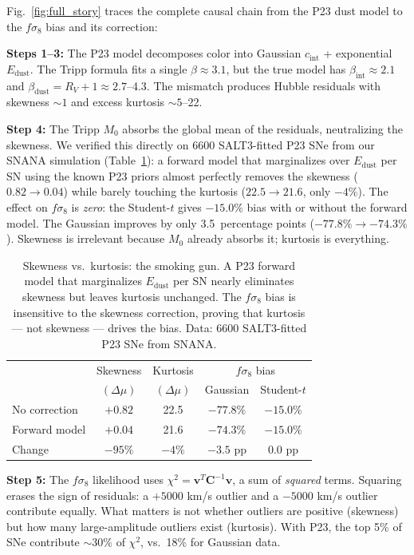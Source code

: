 \documentclass[fleqn,usenatbib]{mnras}
\begin{document}
Fig.~\ref{fig:full_story} traces the complete causal chain from
the P23 dust model to the $f\sigma_8$ bias and its correction:

\textbf{Steps 1--3:} The P23 model decomposes color into Gaussian
$c_\mathrm{int}$ + exponential $E_\mathrm{dust}$. The Tripp
formula fits a single $\beta \approx 3.1$, but the true model
has $\beta_\mathrm{int} \approx 2.1$ and
$\beta_\mathrm{dust} = R_V{+}1 \approx 2.7$--4.3. The mismatch
produces Hubble residuals with skewness $\sim 1$ and excess
kurtosis $\sim 5$--22.

\textbf{Step 4:} The Tripp $M_0$ absorbs the global mean of the
residuals, neutralizing the skewness. We verified this directly
on 6600 SALT3-fitted P23 SNe from our SNANA simulation
(Table~\ref{tab:skew_vs_kurt}): a forward model that
marginalizes over $E_\mathrm{dust}$ per SN using the known P23
priors almost perfectly removes the skewness ($0.82 \to 0.04$)
while barely touching the kurtosis ($22.5 \to 21.6$, only
$-4\%$). The effect on $f\sigma_8$ is \emph{zero}: the
Student-$t$ gives $-15.0\%$ bias with or without the forward
model. The Gaussian improves by only 3.5~percentage points
($-77.8\% \to -74.3\%$). Skewness is irrelevant because $M_0$
already absorbs it; kurtosis is everything.

\begin{table}
\centering
\caption{Skewness vs.\ kurtosis: the smoking gun. A P23 forward
model that marginalizes $E_\mathrm{dust}$ per SN nearly
eliminates skewness but leaves kurtosis unchanged. The
$f\sigma_8$ bias is insensitive to the skewness correction,
proving that kurtosis --- not skewness --- drives the bias.
Data: 6600 SALT3-fitted P23 SNe from SNANA.}
\label{tab:skew_vs_kurt}
\begin{tabular}{lcccc}
\toprule
& Skewness & Kurtosis & \multicolumn{2}{c}{$f\sigma_8$ bias} \\
& $(\Delta\mu)$ & $(\Delta\mu)$ & Gaussian & Student-$t$ \\
\midrule
No correction & $+0.82$ & 22.5 & $-77.8\%$ & $-15.0\%$ \\
Forward model & $+0.04$ & 21.6 & $-74.3\%$ & $-15.0\%$ \\
\midrule
Change & $-95\%$ & $-4\%$ & $-3.5$ pp & $0.0$ pp \\
\bottomrule
\end{tabular}
\end{table}

\textbf{Step 5:} The $f\sigma_8$ likelihood uses
$\chi^2 = \bm{v}^T\bm{C}^{-1}\bm{v}$, a sum of \emph{squared}
terms. Squaring erases the sign of residuals: a $+5000$ km/s
outlier and a $-5000$ km/s outlier contribute equally. What
matters is not whether outliers are positive (skewness) but how
many large-amplitude outliers exist (kurtosis). With P23, the
top 5\% of SNe contribute $\sim 30\%$ of $\chi^2$, vs.\ 18\%
for Gaussian data.
\end{document}
